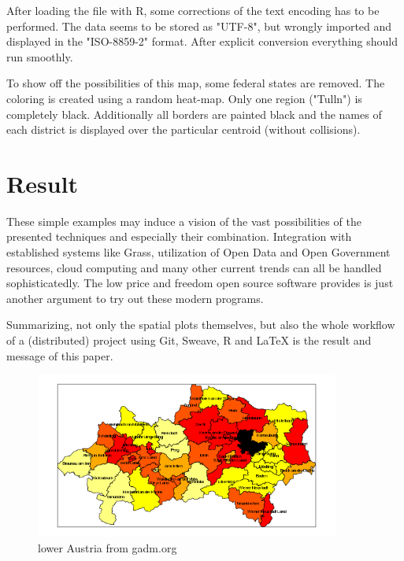 \documentclass{ifacconf}
\begin{document}
After loading the file with R, some corrections of the text encoding has
to be performed. The data seems to be stored as "UTF-8", but wrongly
imported and displayed in the "ISO-8859-2" format. After explicit conversion
everything should run smoothly.

To show off the possibilities of this map, some federal states are removed. 
The coloring is created using a random heat-map. Only one region ("Tulln")
is completely black. Additionally all borders are painted black and the names
of each district is displayed over the particular centroid (without collisions).



\section{Result}
These simple examples 
may induce a vision  of the vast possibilities of the presented techniques and 
especially their combination. Integration with established systems like Grass,
utilization of Open Data and Open Government resources, cloud computing and many other 
current trends can all be handled sophisticatedly. The low price and
freedom open source software provides is just another argument to try out
these modern programs.

Summarizing, not only the spatial plots themselves, but also the whole workflow
of a (distributed) project using Git, Sweave, R and LaTeX is the result and 
message of this paper.



\begin{figure}[h]
\begin{center}
\includegraphics[width=10cm]{pics/northAustria.png}    %
\caption{lower Austria from gadm.org} 
\label{fig:noe}
\end{center}
\end{figure}

   
\end{document}
